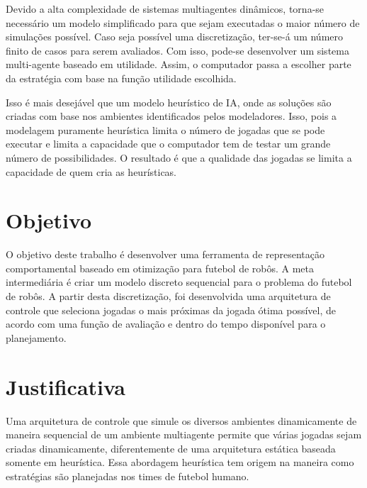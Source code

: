 Devido a alta complexidade de sistemas multiagentes dinâmicos, torna-se
necessário um modelo simplificado para que sejam executadas o maior número de
simulações possível.  Caso seja possível uma discretização, ter-se-á um número
finito de casos para serem avaliados.  Com isso, pode-se desenvolver um sistema
multi-agente baseado em utilidade.  Assim, o computador passa a escolher parte
da estratégia com base na função utilidade escolhida.

Isso é mais desejável que um modelo heurístico de IA, onde as soluções são
criadas com base nos ambientes identificados pelos modeladores.  Isso, pois a
modelagem puramente heurística limita o número de jogadas que se pode executar e
limita a capacidade que o computador tem de testar um grande número de
possibilidades.  O resultado é que a qualidade das jogadas se limita a
capacidade de quem cria as heurísticas.

\section{Objetivo}

O objetivo deste trabalho é desenvolver uma ferramenta de representação
comportamental baseado em otimização para futebol de robôs.
A meta intermediária é criar um modelo discreto sequencial para o problema do
futebol de robôs.  A partir desta discretização, foi desenvolvida uma arquitetura
de controle que seleciona jogadas o mais próximas da jogada ótima possível, de
acordo com uma função de avaliação e dentro do tempo disponível para o
planejamento.

\section{Justificativa}

Uma arquitetura de controle que simule os diversos ambientes dinamicamente de
maneira sequencial de um ambiente multiagente permite que várias jogadas sejam
criadas dinamicamente, diferentemente de uma arquitetura estática baseada
somente em heurística.  Essa abordagem heurística tem origem na maneira como
estratégias são planejadas nos times de futebol humano.


